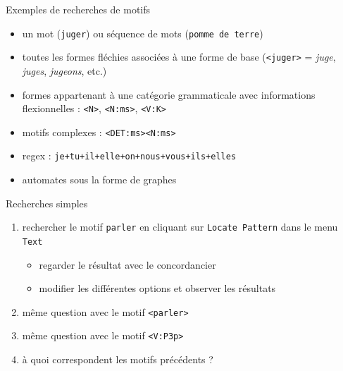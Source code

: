 \documentclass[xetex,xcolor={table,usenames,dvipsnames}]{beamer}
\begin{document}
\begin{frame}{Exemples de recherches de motifs}
	\begin{itemize}
		\item un mot (\texttt{juger}) ou séquence de mots (\texttt{pomme de terre})
		\item toutes les formes fléchies associées à une forme de base (\texttt{<juger>} = \textit{juge}, \textit{juges}, \textit{jugeons}, etc.)
		\item formes appartenant à une catégorie grammaticale avec informations flexionnelles : \texttt{<N>}, \texttt{<N:ms>}, \texttt{<V:K>}
		\item motifs complexes : \texttt{<DET:ms><N:ms>}
		\item regex : \texttt{je+tu+il+elle+on+nous+vous+ils+elles}
		\item automates sous la forme de graphes
	\end{itemize}
\end{frame}
\begin{frame}{Recherches simples}
	\begin{enumerate}
		\item rechercher le motif \texttt{parler} en cliquant sur \texttt{Locate Pattern} dans le menu \texttt{Text}
		\begin{itemize}
			\item regarder le résultat avec le concordancier
			\item modifier les différentes options et observer les résultats
		\end{itemize}
		\item même question avec le motif \texttt{<parler>}
		\item même question avec le motif \texttt{<V:P3p>}
		\item à quoi correspondent les motifs précédents ?
	\end{enumerate}
\end{frame}
\end{document}

